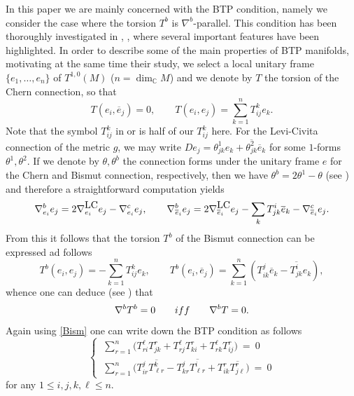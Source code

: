 \documentclass{amsart}
\numberwithin{equation}{section}
\theoremstyle{definition}
\renewcommand{\1}{\mathds{1}}
\renewcommand{\>}{\rightarrow}
\begin{document}
In this paper we are mainly concerned with the {\rm BTP} condition, namely we consider the case where the torsion $T^b$ is $\nabla^b$-parallel. This condition has been thoroughly investigated in \cite{ZhaoZ19Str}, \cite{ZhaoZ22},  where several important features have been highlighted. In order to describe some of the main properties of {\rm BTP} manifolds, motivating at the same time their study, we select a local unitary frame $\{e_1,\ldots,e_n\}$ of $T^{1,0}(M)$ ($n=\dim_{\mathbb C}M$) and we denote by $T$ the torsion of the Chern connection, so that
$$T(e_i,\overline e_j)=0,\qquad T(e_i,e_j) =  \sum_{k=1}^nT^k_{ij}e_k.$$
Note that the symbol $T^k_{ij}$ in \cite{ZhaoZ19Str} or \cite{ZhaoZ22} is half of our $T^k_{ij}$ here. For the Levi-Civita connection of the metric $g$, we may write $D e_j = \theta^1_{jk}e_k + \overline{\theta^2_{jk}}\overline e_k$ for some $1$-forms $\theta^1,\theta^2$. If we denote by $\theta,\theta^b$ the connection forms under the unitary frame $e$ for the Chern and Bismut connection, respectively, then we have $\theta^b = 2\theta^1-\theta$ (see \cite{WYZ}) and therefore a straightforward computation yields
\begin{equation}\label{Bism}
\nabla^b_{e_i}e_j = 2\nabla^{\mbox{\tiny LC}}_{e_i}e_j -\nabla^c_{e_i}e_j, \qquad  \nabla^b_{\overline e_i}e_j =2\nabla^{\mbox{\tiny LC}}_{\overline e_i}e_j -\sum_k T^i_{jk}\overline{e}_k - \nabla^c_{\overline e_i}e_j.
\end{equation}
From this it follows that the torsion $T^b$ of the Bismut connection can be expressed ad follows
$$ T^b(e_i,e_j) = -\sum_{k=1}^n T^k_{ij}e_k,\qquad T^b(e_i,\overline e_j) = \sum_{k=1}^n\left( T^j_{ik}\overline e_k - \overline{T^i_{jk}}e_k\right),$$
whence one can deduce (see \cite{ZhaoZ19Str}) that
\begin{equation}  \nabla^b T^b =0 \qquad {\rm{iff}}\qquad \nabla^b T = 0.\end{equation}
Again using \eqref{Bism} one can write down the {\rm BTP} condition as follows
\begin{equation}\label{BTP}
\left\{ \begin{split}
 \ \sum_{r=1}^n \big( T^{\ell}_{ri}T^r_{jk} + T^{\ell}_{rj}T^r_{ki} + T^{\ell}_{rk}T^r_{ij}  \big) \ = \ 0  \\
\  \sum_{r=1}^n \big( T^{j}_{ir} \overline{ T^k_{\ell r} } - T^{j}_{kr} \overline{ T^i_{\ell r} } + T^{r}_{ik} \overline{ T^r_{j\ell } } \big) \ = \ 0
 \end{split} \right.
\end{equation}
for any $1\leq i,j,k,\ell \leq n$.
\end{document}
